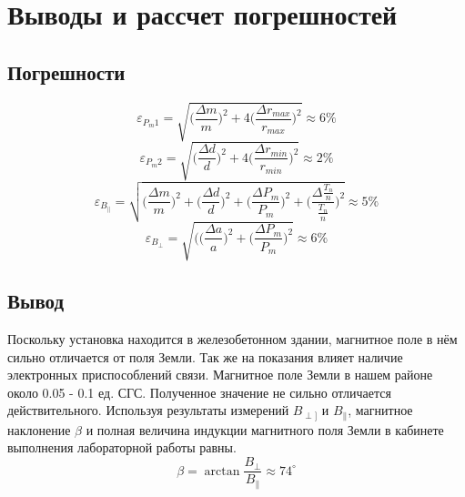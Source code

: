\documentclass[a4paper,12pt]{article}
\begin{document}
\section*{Выводы и рассчет погрешностей}
\subsection*{Погрешности}
$$ \varepsilon_{P_m1} = \sqrt{\Big(\frac{\Delta m}m\Big)^2 + 4\Big(\frac{\Delta r_{max}}{r_{max}}\Big)^2} \approx 6 \%$$
$$ \varepsilon_{P_m2} = \sqrt{\Big(\frac{\Delta d}d\Big)^2 + 4\Big(\frac{\Delta r_{min}}{r_{min}}\Big)^2} \approx 2 \%$$
\[\varepsilon_{B_{\|}} = \sqrt{\Big(\frac{\Delta m}m\Big)^2 + \Big(\frac{\Delta d}d\Big)^2 + \Big(\frac{\Delta P_m}{P_m}\Big)^2 + \Big(\frac{\Delta \frac{T_n}{n}}{\frac{T_n}{n}}\Big)^2} \approx 5 \% \]
\[\varepsilon_{B_{\perp}} = \sqrt{(\Big(\frac{\Delta a}a\Big)^2 + \Big(\frac{\Delta P_m}{P_m}\Big)^2} \approx 6 \%\]
\subsection*{Вывод}
Поскольку  установка находится в железобетонном
здании, магнитное поле в нём сильно отличается от поля Земли. Так же на
показания влияет наличие электронных приспособлений связи. Магнитное
поле Земли в нашем районе около 0.05 - 0.1 ед. СГС. Полученное значение не сильно отличается действительного.  
Используя результаты измерений $B_{\perp]}$ и $B_{\|}$, магнитное наклонение $\beta$ и полная величина индукции магнитного поля Земли в кабинете выполнения лабораторной работы равны. 
$$\beta = \arctan{\frac{B_{\perp}}{B_{\|}}} \approx 74^{\circ}  $$
\end{document}
